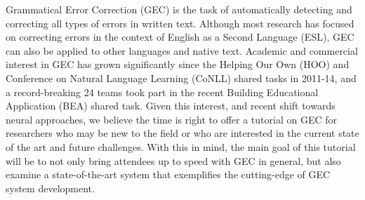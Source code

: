 Grammatical Error Correction (GEC) is the task of automatically detecting and correcting all types of errors in written text. Although most research has focused on correcting errors in the context of English as a Second Language (ESL), GEC can also be applied to other languages and native text. Academic and commercial interest in GEC has grown significantly since the Helping Our Own (HOO) and Conference on Natural Language Learning (CoNLL) shared tasks in 2011-14, and a record-breaking 24 teams took part in the recent Building Educational Application (BEA) shared task. Given this interest, and recent shift towards neural approaches, we believe the time is right to offer a tutorial on GEC for researchers who may be new to the field or who are interested in the current state of the art and future challenges. With this in mind, the main goal of this tutorial will be to not only bring attendees up to speed with GEC in general, but also examine a state-of-the-art system that exemplifies the cutting-edge of GEC system development.
